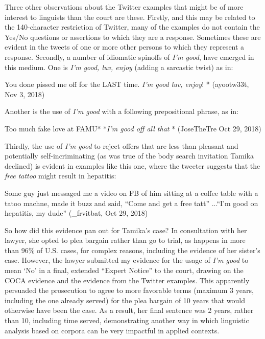 \documentclass[output=paper,colorlinks,citecolor=brown]{langscibook}
\begin{document}
Three other observations about the Twitter examples that might be of more interest to linguists than the court are these.  Firstly, and this may be related to the 140-character restriction of Twitter, many of the examples do not contain the Yes\slash No questions or assertions to which they are a response.  Sometimes these are evident in the tweets of one or more other persons to which they represent a response.  Secondly, a number of idiomatic spinoffs of \textit{I'm good}, have emerged in this medium.  One is \textit{I'm good, luv, enjoy} (adding a sarcastic twist) as in:

\ea%
\label{ex:rickford:18}
You done pissed me off for the LAST time.  \textit{I'm good luv, enjoy}! * (ayootw33t,  Nov 3, 2018)
\z

Another is the use of \textit{I'm good} with a following prepositional phrase, as in:

\ea%
    \label{ex:rickford:19}
 Too much fake love at FAMU*  *\textit{I'm good off all that} * (JoseTheTre Oct 29, 2018)
\z  
  
  
Thirdly, the use of \textit{I'm good} to reject offers that are less than pleasant and potentially self-incriminating (as was true of the body search invitation Tamika declined) is evident in examples like this one, where the tweeter suggests that the \textit{free tattoo} might result in hepatitis:

\ea%
\label{ex:rickford:20}
Some guy just messaged me a video on FB of him sitting at a coffee table with a tatoo machne, made it buzz and said, “Come and get a free tatt” ...“I'm good on hepatitis, my dude”  (\_frvitbat, Oct 29, 2018)
\z

So how did this evidence pan out for Tamika’s case? In consultation with her lawyer, she opted to plea bargain rather than go to trial, as happens in more than 96\% of U.S. cases, for complex reasons, including the evidence of her sister’s case.  However, the lawyer submitted my evidence for the usage of \textit{I'm good} to mean `No' in a final, extended “Expert Notice” to the court, drawing on the COCA evidence and the evidence from the Twitter examples.  This apparently persuaded the prosecution to agree to more favorable terms (maximum 3 years, including the one already served) for the plea bargain of 10 years that would otherwise have been the case. As a result, her final sentence was 2 years, rather than 10, including time served, demonstrating another way in which linguistic analysis based on corpora can be very impactful in applied contexts.
\end{document}
